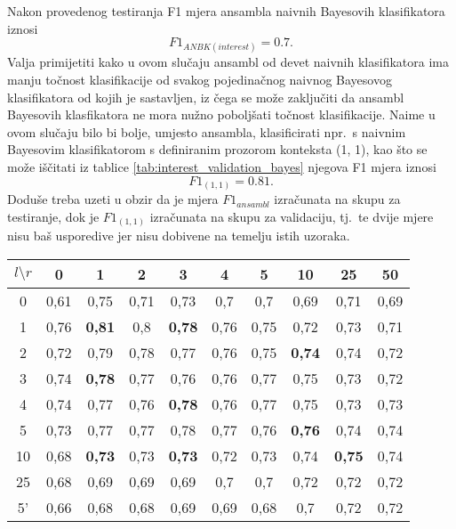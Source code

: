 \documentclass[10pt, a4paper]{article}
\begin{document}
Nakon provedenog testiranja F1 mjera ansambla naivnih Bayesovih klasifikatora
iznosi
\begin{equation}
\label{eq:F1_ansambl}
F1_{ANBK(interest)} = 0.7.
\end{equation}
Valja primijetiti kako u ovom
slučaju ansambl od devet naivnih klasifikatora ima manju točnost klasifikacije
od svakog pojedinačnog naivnog Bayesovog klasifikatora od kojih je sastavljen,
iz čega se može zaključiti da ansambl Bayesovih klasfikatora ne mora nužno poboljšati
točnost klasifikacije. Naime u ovom slučaju bilo bi bolje, umjesto ansambla, klasificirati
npr.~s naivnim Bayesovim klasifikatorom s definiranim prozorom konteksta (1, 1), kao
što se može iščitati iz tablice \ref{tab:interest_validation_bayes} njegova F1 mjera iznosi
\begin{equation}
\label{eq:F1_1_1}
F1_{(1,1)} = 0.81.
\end{equation}
Doduše treba uzeti u obzir da je mjera $F1_{ansambl}$ izračunata na skupu za testiranje,
dok je $F1_{(1,1)}$ izračunata na skupu za validaciju, tj.~te dvije mjere nisu
baš usporedive jer nisu dobivene na temelju istih uzoraka.

\begin{table*}[!hbtp]
\caption{F1 mjere Bayesovih klasifikatora dobivene validacijom za riječ \emph{interest}}
\label{tab:interest_validation_bayes}
\begin{center}
\begin{tabular}{|c|ccccccccc|}
\hline
$l \setminus r$ & 0 & 1 & 2 & 3 & 4 & 5 & 10 & 25 & 50 \\
\hline
0  & 0,61 & 0,75 & 0,71 & 0,73 & 0,7  & 0,7  & 0,69 & 0,71 & 0,69  \\
1  & 0,76 & \textbf{0,81} & 0,8  & \textbf{0,78} & 0,76 & 0,75 & 0,72 & 0,73 & 0,71  \\
2  & 0,72 & 0,79 & 0,78 & 0,77 & 0,76 & 0,75 & \textbf{0,74} & 0,74 & 0,72  \\
3  & 0,74 & \textbf{0,78} & 0,77 & 0,76 & 0,76 & 0,77 & 0,75 & 0,73 & 0,72  \\
4  & 0,74 & 0,77 & 0,76 & \textbf{0,78} & 0,76 & 0,77 & 0,75 & 0,73 & 0,73  \\
5  & 0,73 & 0,77 & 0,77 & 0,78 & 0,77 & 0,76 & \textbf{0,76} & 0,74 & 0,74  \\
10 & 0,68 & \textbf{0,73} & 0,73 & \textbf{0,73} & 0,72 & 0,73 & 0,74 & \textbf{0,75} & 0,74  \\
25 & 0,68 & 0,69 & 0,69 & 0,69 & 0,7  & 0,7  & 0,72 & 0,72 & 0,72  \\
5' & 0,66 & 0,68 & 0,68 & 0,69 & 0,69 & 0,68 & 0,7  & 0,72 & 0,72  \\
\hline
\end{tabular}
\end{center}
\end{table*}
\end{document}
